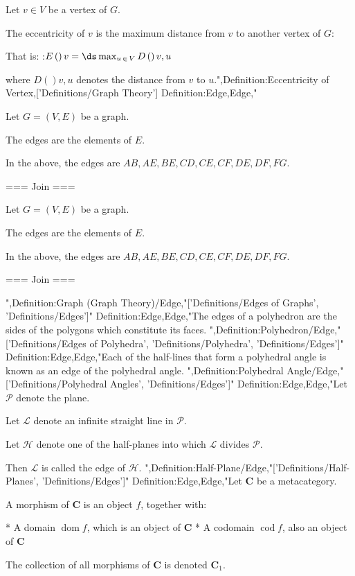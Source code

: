 Let $v \in V$ be a vertex of $G$.


The eccentricity of $v$ is the maximum distance from $v$ to another vertex of $G$:


That is:
:$E \left(   \right)v = \ds \max_{u \mathop \in V} D \left(   \right){v, u}$

where $D \left(   \right){v, u}$ denotes the distance from $v$ to $u$.",Definition:Eccentricity of Vertex,['Definitions/Graph Theory']
Definition:Edge,Edge,"


Let $G = \left( V, E \right)$ be a graph.

The edges are the elements of $E$.


In the above, the edges are $AB, AE, BE, CD, CE, CF, DE, DF, FG$.


=== Join ===




Let $G = \left( V, E \right)$ be a graph.

The edges are the elements of $E$.


In the above, the edges are $AB, AE, BE, CD, CE, CF, DE, DF, FG$.


=== Join ===

",Definition:Graph (Graph Theory)/Edge,"['Definitions/Edges of Graphs', 'Definitions/Edges']"
Definition:Edge,Edge,"The edges of a polyhedron are the sides of the polygons which constitute its faces.
",Definition:Polyhedron/Edge,"['Definitions/Edges of Polyhedra', 'Definitions/Polyhedra', 'Definitions/Edges']"
Definition:Edge,Edge,"Each of the half-lines that form a polyhedral angle is known as an edge of the polyhedral angle.
",Definition:Polyhedral Angle/Edge,"['Definitions/Polyhedral Angles', 'Definitions/Edges']"
Definition:Edge,Edge,"Let $\mathcal P$ denote the plane.

Let $\mathcal L$ denote an infinite straight line in $\mathcal P$.

Let $\mathcal H$ denote one of the half-planes into which $\mathcal L$ divides $\mathcal P$.

Then $\mathcal L$ is called the edge of $\mathcal H$.
",Definition:Half-Plane/Edge,"['Definitions/Half-Planes', 'Definitions/Edges']"
Definition:Edge,Edge,"Let $\mathbf C$ be a metacategory.


A morphism of $\mathbf C$ is an object $f$, together with:

* A domain $\operatorname {dom} f$, which is an object of $\mathbf C$
* A codomain $\operatorname {cod} f$, also an object of $\mathbf C$


The collection of all morphisms of $\mathbf C$ is denoted $\mathbf C_1$.


